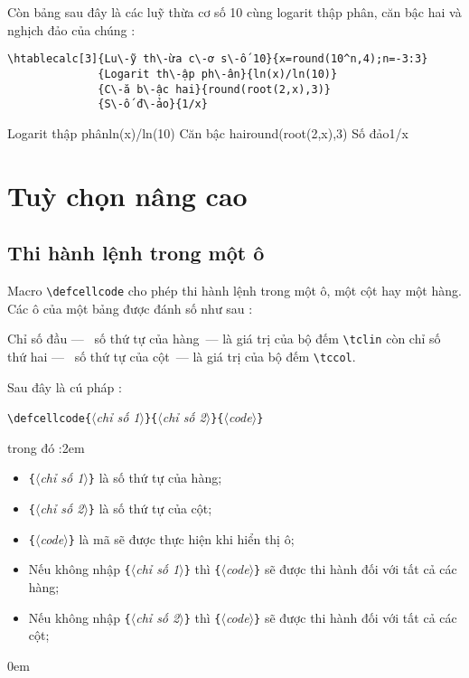 \documentclass[a4paper,10pt]{article}
\newcommand\argu[1]{$\langle$\textit{#1}$\rangle$}
\newcommand\ARGU[1]{\texttt{\{}\argu{#1}\texttt{\}}}
\newcommand\verbinline{\lstinline[breaklines=false,basicstyle=\normalsize\ttfamily]}
\newcommand\mywidth{0.85\linewidth}
\begin{document}
Còn bảng sau đây là các luỹ thừa cơ số 10 cùng logarit thập phân, căn bậc hai và nghịch đảo của chúng :
\begin{center}
\begin{minipage}{\mywidth}
\begin{lstlisting}
\htablecalc[3]{Lu\-ỹ th\-ừa c\-ơ s\-ố 10}{x=round(10^n,4);n=-3:3}
              {Logarit th\-ập ph\-ân}{ln(x)/ln(10)}
              {C\-ă b\-ậc hai}{round(root(2,x),3)}
              {S\-ố đ\-ảo}{1/x}
\end{lstlisting}
\end{minipage}

              {Logarit thậ\-p phâ\-n}{ln(x)/ln(10)}
              {Că\-n bậ\-c hai}{round(root(2,x),3)}
              {Số\- đả\-o}{1/x}
\end{center}

\section{Tuỳ chọn nâng cao}
\subsection{Thi hành lệnh trong một ô}
Macro \verbinline|\defcellcode| cho phép thi hành lệnh trong một ô, một cột hay một hàng. Các ô của một bảng được đánh số như sau :\smallskip

\begin{center}
	\def\tcprintvalue#1{}\def\tcprintresult#1#2{}
	\edefcellcode{}{}{(\number\tclin,\number\tccol)}
\end{center}
\medskip

Chỉ số đầu ---~ số thứ tự của hàng~--- là giá trị của bộ đếm \verbinline{\tclin} còn chỉ số thứ hai ---~ số thứ tự của cột~--- là giá trị của bộ đếm \verbinline{\tccol}.\smallskip

Sau đây là cú pháp :

\verbinline|\defcellcode|\ARGU{chỉ số 1}\ARGU{chỉ số 2}\ARGU{code}
\smallskip

trong đó :\parindent2em
\begin{itemize}
	\item \ARGU{chỉ số 1} là số thứ tự của hàng;
	\item \ARGU{chỉ số 2} là số thứ tự của cột;
	\item \ARGU{code} là mã sẽ được thực hiện khi hiển thị ô;
	\item Nếu không nhập \ARGU{chỉ số 1} thì \ARGU{code} sẽ được thi hành đối với tất cả các hàng;
	\item Nếu không nhập \ARGU{chỉ số 2} thì \ARGU{code} sẽ được thi hành đối với tất cả các cột;
\end{itemize}\parindent0em
\smallskip
\end{document}

